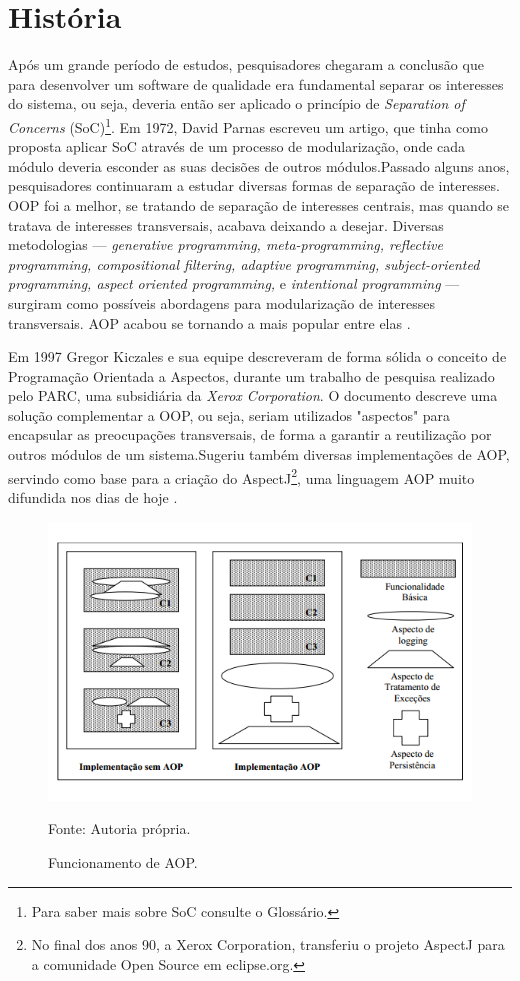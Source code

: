 \documentclass[tc,openright]{iiufrgs}
\begin{document}
\section{História}
Após um grande período de estudos, pesquisadores chegaram a conclusão que para desenvolver um software de qualidade era fundamental separar os interesses do sistema, ou seja, deveria então ser aplicado o princípio de \textit{Separation of Concerns} (SoC)\footnote{Para saber mais sobre SoC consulte o Glossário.}. Em 1972, David Parnas escreveu um artigo, que tinha como  proposta aplicar SoC através de um processo de modularização, onde cada módulo deveria esconder as suas decisões de outros módulos.Passado alguns anos, pesquisadores continuaram a estudar diversas formas de separação de interesses. OOP foi a melhor, se tratando de separação de interesses centrais, mas quando se tratava de interesses transversais, acabava deixando a desejar. Diversas metodologias — \textit{generative programming, meta-programming, reflective programming, compositional filtering, adaptive programming, subject-oriented programming, aspect oriented programming,} e  \textit{intentional programming} — surgiram como possíveis abordagens para modularização de interesses transversais. AOP acabou se tornando a mais popular entre elas \cite{laddad2003aspectj}.

Em 1997 Gregor Kiczales e sua equipe descreveram de forma sólida o conceito de Programação Orientada a Aspectos, durante um trabalho de pesquisa realizado pelo PARC, uma subsidiária da \textit{Xerox Corporation}. O documento descreve uma solução complementar a OOP, ou seja, seriam utilizados "aspectos" para encapsular as preocupações transversais, de forma a garantir a reutilização por outros módulos de um sistema.Sugeriu também diversas implementações de AOP, servindo como base para a criação do AspectJ\footnote{No final dos anos 90, a Xerox Corporation, transferiu o projeto AspectJ para a comunidade Open Source em eclipse.org.}, uma linguagem AOP muito difundida nos dias de hoje \cite{groves2013aop}.

\begin{figure}[ht]
	\centering
	\includegraphics[scale=0.6]{figuras/funcionamentoAOP.png}
	\caption{Funcionamento de AOP.}
	\small{Fonte: Autoria própria.}
	\label{fig:funcionamentoAOP}
\end{figure}
\end{document}
